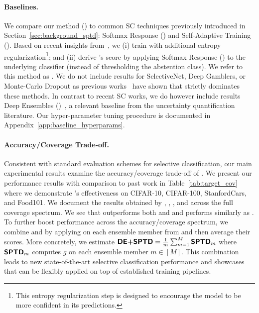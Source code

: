 \paragraph{Baselines.} We compare our method (\sptd) to common SC techniques previously introduced in Section~\ref{sec:background_sptd}: Softmax Response (\sr) and Self-Adaptive Training (\sat). Based on recent insights from~\cite{feng2023towards}, we (i) train \sat with additional entropy regularization\footnote{This entropy regularization step is designed to encourage the model to be more confident in its predictions.}; and (ii) derive \sat's score by applying Softmax Response (\sr) to the underlying classifier (instead of thresholding the abstention class). We refer to this method as \satersr. We do not include results for SelectiveNet, Deep Gamblers, or Monte-Carlo Dropout as previous works~\citep{huang2020self,feng2023towards} have shown that \fixed{\satersr} strictly dominates these methods. In contrast to recent SC works, we do however include results  Deep Ensembles (\de)~\citep{balaji2017uncertainty}, a relevant baseline from the uncertainty quantification literature. Our hyper-parameter tuning procedure is documented in Appendix~\ref{app:baseline_hyperparams}.

\paragraph{Accuracy/Coverage Trade-off.} Consistent with standard evaluation schemes for selective classification, our main experimental results examine the accuracy/coverage trade-off of \sptd. We present our performance results with comparison to past work in Table~\ref{tab:target_cov} where we demonstrate \sptd's effectiveness on CIFAR-10, CIFAR-100, StanfordCars, and Food101. We document the results obtained by \sptd, \sat, \sr, and \de across the full coverage spectrum. We see that \sptd outperforms both \sat and \sr and performs similarly as \de. To further boost performance across the accuracy/coverage spectrum, we combine \sptd and \de by applying \sptd on each ensemble member from \de and then average their scores. More concretely, we estimate $\textbf{\sffamily DE+SPTD} = \frac{1}{m}\sum_{m=1}^M \textbf{\sffamily SPTD}_m$ where $\textbf{\sffamily SPTD}_m$ computes $g$ on each ensemble member $m\in[M]$. This combination leads to new state-of-the-art selective classification performance and showcases that \sptd can be flexibly applied on top of established training pipelines. 

